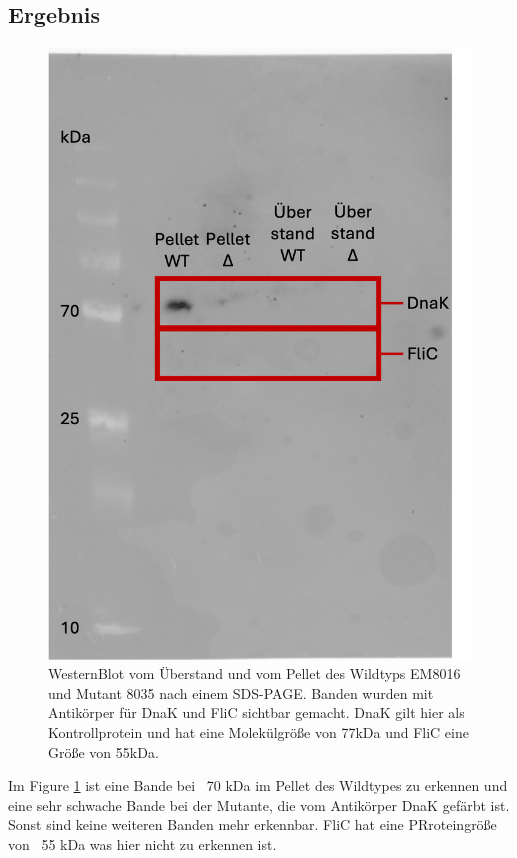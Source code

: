 \documentclass[oneside,10pt,a4paper]{report}
\begin{document}
			\subsection{Ergebnis}
				\begin{figure}[H]
				\centering
				\includegraphics[scale=0.5]{Exp6part1.png}
				\caption{WesternBlot vom Überstand und vom Pellet des Wildtyps EM8016 und Mutant 8035 nach einem SDS-PAGE. Banden wurden mit Antikörper für DnaK und FliC sichtbar gemacht. DnaK gilt hier als Kontrollprotein und hat eine Molekülgröße von 77kDa und FliC eine Größe von 55kDa.}
				\label{fig: Westernblot}
			\end{figure}
			Im Figure \ref{fig: Westernblot} ist eine Bande bei ~70 kDa im Pellet des Wildtypes zu erkennen und eine sehr schwache Bande bei der Mutante, die vom Antikörper DnaK gefärbt ist. Sonst sind keine weiteren Banden mehr erkennbar. FliC hat eine PRroteingröße von ~55 kDa was hier nicht zu erkennen ist.
			
\end{document}
